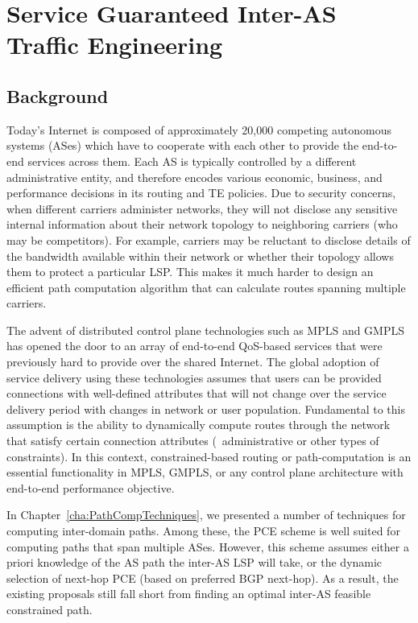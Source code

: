 \chapter{Service Guaranteed Inter-AS Traffic Engineering}
\label{chap:ServiceGuarTE}

\section{Background}
Today's Internet is composed of approximately 20,000 competing autonomous systems (ASes) which have to cooperate with each other to provide the end-to-end services across them. Each AS is typically controlled by a different administrative entity, and therefore encodes various economic, business, and performance decisions in its routing and TE policies. Due to security concerns, when different carriers administer networks, they will not disclose any sensitive internal information about their network topology to neighboring carriers (who may be competitors). For example, carriers may be reluctant to disclose details of the bandwidth available within their network or whether their topology allows them to protect a particular LSP. This makes it much harder to design an efficient path computation algorithm that can calculate routes spanning multiple carriers.

The advent of distributed control plane technologies such as MPLS and GMPLS has opened the door to an array of end-to-end QoS-based services that were previously hard to provide over the shared Internet. The global adoption of service delivery using these technologies assumes that users can be provided connections with well-defined attributes that will not change over the service delivery period with changes in network or user population. Fundamental to this assumption is the ability to dynamically compute routes through the network that satisfy certain connection attributes (\eg\ administrative or other types of constraints). In this context, constrained-based routing or path-computation is an essential functionality in MPLS, GMPLS, or any control plane architecture with end-to-end performance objective.

In Chapter~\ref{cha:PathCompTechniques}, we presented a number of techniques for computing inter-domain paths. Among these, the PCE scheme is well suited for computing paths that span multiple ASes. However, this scheme assumes either a priori knowledge of the AS path the inter-AS LSP will take, or the dynamic selection of next-hop PCE (\eg based on preferred BGP next-hop). As a result, the existing proposals still fall short from finding an optimal inter-AS feasible constrained path. 

